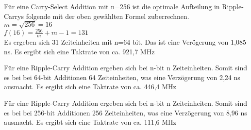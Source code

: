 \documentclass{article}
\begin{document}
      Für eine Carry-Select Addition mit n=256 ist die optimale Aufteilung in Ripple-Carrys folgende mit der oben gewählten Formel zuberrechnen. \\
      $m=\sqrt{256}=16$ \\
      $f(16)=\frac{256}{m}+m-1=131$\\
      Es ergeben sich 31 Zeiteinheiten mit n=64 bit. Das ist eine Verögerung von 1,085 ns.
      Es ergibt sich eine Taktrate von ca. 921,7 MHz

      Für eine Ripple-Carry Addition ergeben sich bei n-bit n Zeiteinheiten. Somit sind es bei bei 64-bit Additionen 64 Zeiteinheiten, was eine Verzögerung von 2,24 ns ausmacht.
      Es ergibt sich eine Taktrate von ca. 446,4 MHz

      Für eine Ripple-Carry Addition ergeben sich bei n-bit n Zeiteinheiten. Somit sind es bei bei 256-bit Additionen 256 Zeiteinheiten, was eine Verzögerung von 8,96 ns ausmacht.
      Es ergibt sich eine Taktrate von ca. 111,6 MHz
\end{document}
